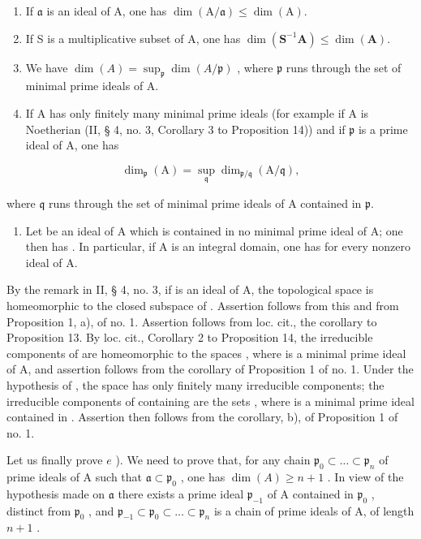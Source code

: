 \begin{enumerate}
\def\labelenumi{\alph{enumi})}
\item
  If \(\mathfrak{a}\) is an ideal of A, one has \(\dim (\mathrm{A} / \mathfrak{a})\leqslant \dim (\mathrm{A}).\)
\item
  If S is a multiplicative subset of A, one has \(\dim (\mathbf{S}^{-1}\mathbf{A})\leqslant \dim (\mathbf{A}).\)
\item
  We have \(\dim(A) = \sup_{\mathfrak{p}} \dim(A/\mathfrak{p})\) , where \(\mathfrak{p}\) runs through the set of minimal prime ideals of A.
\item
  If A has only finitely many minimal prime ideals (for example if A is Noetherian (II, § 4, no. 3, Corollary 3 to Proposition 14)) and if \(\mathfrak{p}\) is a prime ideal of A, one has
\end{enumerate}

\[
\dim_ {\mathfrak {p}} (\mathrm{A}) = \sup _ {\mathfrak {q}} \dim_ {\mathfrak {p} / \mathfrak {q}} (\mathrm{A} / \mathfrak {q}),
\]

where \(\mathfrak{q}\) runs through the set of minimal prime ideals of A contained in \(\mathfrak{p}\).

\begin{enumerate}
\def\labelenumi{\alph{enumi})}
\setcounter{enumi}{4}
\tightlist
\item
  Let  be an ideal of A which is contained in no minimal prime ideal of A; one then has . In particular, if A is an integral domain, one has  for every nonzero ideal  of A.
\end{enumerate}

By the remark in II, § 4, no. 3, if  is an ideal of A, the topological space  is homeomorphic to the closed subspace  of . Assertion  follows from this and from Proposition 1, a), of no. 1. Assertion  follows from loc. cit., the corollary to Proposition 13. By loc. cit., Corollary 2 to Proposition 14, the irreducible components of  are homeomorphic to the spaces , where  is a minimal prime ideal of A, and assertion  follows from the corollary of Proposition 1 of no. 1. Under the hypothesis of , the space  has only finitely many irreducible components; the irreducible components of  containing  are the sets , where  is a minimal prime ideal contained in . Assertion  then follows from the corollary, b), of Proposition 1 of no. 1.

Let us finally prove \(e\) ). We need to prove that, for any chain \(\mathfrak{p}_{0} \subset \ldots \subset \mathfrak{p}_{n}\) of prime ideals of A such that \(\mathfrak{a} \subset \mathfrak{p}_{0}\) , one has \(\dim(A) \geqslant n + 1\) . In view of the hypothesis made on \(\mathfrak{a}\) there exists a prime ideal \(\mathfrak{p}_{-1}\) of A contained in \(\mathfrak{p}_{0}\) , distinct from \(\mathfrak{p}_{0}\) , and \(\mathfrak{p}_{-1} \subset \mathfrak{p}_{0} \subset \ldots \subset \mathfrak{p}_{n}\) is a chain of prime ideals of A, of length \(n + 1\) .

